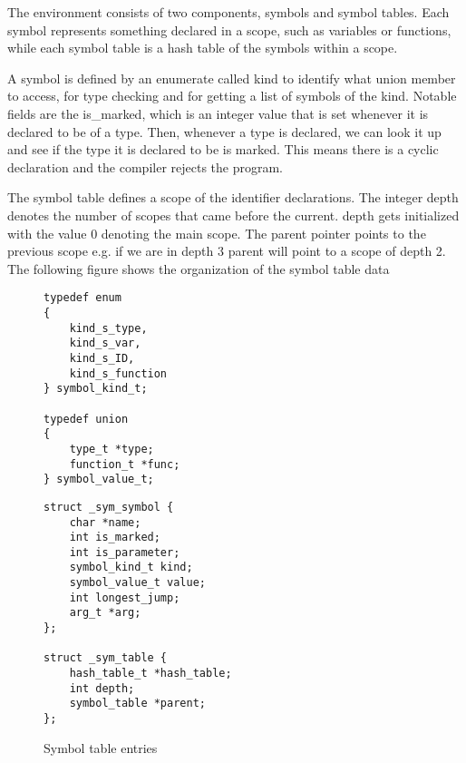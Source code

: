 \documentclass{article}
\begin{document}


The environment consists of two components, symbols and symbol tables. Each symbol represents something declared in a scope, such as variables or functions, while each symbol table is a hash table of the symbols within a scope.

A symbol is defined by an enumerate called kind to identify what union member to access, for type checking and for getting a list of symbols of the kind. Notable fields are the is\_marked, which is an integer value that is set whenever it is declared to be of a type. Then, whenever a type is declared, we can look it up and see if the type it is declared to be is marked. This means there is a cyclic declaration and the compiler rejects the program.

The symbol table defines a scope of the identifier declarations. The integer depth denotes the number of scopes that came before the current. depth gets initialized with the value 0 denoting the main scope. The parent pointer points to the previous scope e.g. if we are in depth 3 parent will point to a scope of depth 2. 
The following figure shows the organization of the symbol table data

\begin{figure}[h]
    \centering
    \begin{minipage}[t]{0.45\textwidth}
        \centering
        \begin{lstlisting}             
typedef enum
{
	kind_s_type,
	kind_s_var,
	kind_s_ID,
	kind_s_function
} symbol_kind_t;

typedef union
{
	type_t *type;
	function_t *func;
} symbol_value_t;                                             
        \end{lstlisting}
    \end{minipage}
    \hfill
    \begin{minipage}[t]{0.45\textwidth}
        \centering
        \begin{lstlisting}            
struct _sym_symbol {
    char *name;
    int is_marked;
    int is_parameter;
    symbol_kind_t kind;
    symbol_value_t value;
    int longest_jump;
    arg_t *arg;
};

struct _sym_table {
    hash_table_t *hash_table;
    int depth;
    symbol_table *parent;
};                      
        \end{lstlisting}             
    \end{minipage} 
    \hfill
    \begin{minipage}[t]{0.9\textwidth}
        \centering
    \end{minipage}
        \caption{Symbol table entries}
\end{figure}
\newpage
\end{document}
